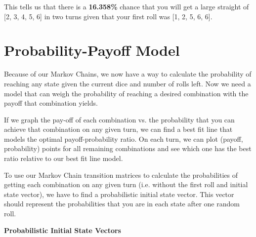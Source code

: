 \documentclass[12pt,a4paper]{article}
\begin{document}
\begin{flushleft}
This tells us that there is a \textbf{16.358\%} chance that you will get a large straight of [2, 3, 4, 5, 6] in two turns given that your first roll was [1, 2, 5, 6, 6].
\end{flushleft}
\section{Probability-Payoff Model}

\begin{flushleft}
Because of our Markov Chains, we now have a way to calculate the probability of reaching any state given the current dice and number of rolls left. Now we need a model that can weigh the probability of reaching a desired combination with the payoff that combination yields.

If we graph the pay-off of each combination vs. the probability that you can achieve that combination on any given turn, we can find a best fit line that models the optimal payoff-probability ratio. On each turn, we can plot (payoff, probability) points for all remaining combinations and see which one has the best ratio relative to our best fit line model.

To use our Markov Chain transition matrices to calculate the probabilities of getting each combination on any given turn (i.e. without the first roll and initial state vector), we have to find a probabilistic initial state vector. This vector should represent the probabilities that you are in each state after one random roll.
\end{flushleft}

\textbf{Probabilistic Initial State Vectors}
\end{document}
